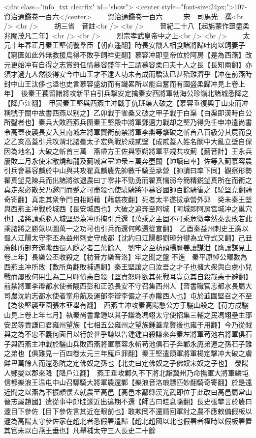 <div class="info_txt clearfix" id="show">
<center style="font-size:24px;">107-資治通鑑卷一百六</center>
  　　資治通鑑卷一百六　　　宋　司馬光　撰<br />
<br />
　　胡三省　音註<br />
<br />
　　晉紀二十八【起旃蒙作噩盡柔兆閹茂凡二年】<br />
<br />
　　烈宗孝武皇帝中之上<br />
<br />
　　太元十年春正月秦王堅朝饗羣臣【朝直遥翻】時長安饑人相食諸將歸吐肉以飼妻子【窮匱如此外無救援烏得不敗乎飼祥吏翻】慕容冲即皇帝位於阿房【是為西燕】改元更始冲有自得之志賞罸任情慕容盛年十三謂慕容柔曰夫十人之長【長知兩翻】亦須才過九人然後得安今中山王才不逮人功未有成而驕汰已甚殆難濟乎【冲在前燕時封中山王汰侈也溢也史言慕容盛幼而有識畧所以能自奮而有國盛柔歸冲見上卷上年】　後秦王萇留諸將攻新平自引兵撃安定擒秦安西將軍勃海公珍嶺北諸城悉降之【降戶江翻】　甲寅秦王堅與西燕主冲戰于仇班渠大破之【慕容垂復興于山東而冲稱號于關中故書西燕以别之】乙卯戰于雀桑又破之甲子戰于白渠【白渠即漢時白公所鑿者也】秦兵大敗西燕兵圍秦王堅殿中將軍鄧邁力戰却之堅乃得免壬申冲遣尚書令高蓋夜襲長安入其南城左將軍竇衝前禁將軍李辯等擊破之斬首八百級分其屍而食之乙亥高蓋引兵攻渭北諸壘太子宏與戰於成貳壁【成貳蓋人姓名關中大亂立壁自保因為地名】大破之斬首三萬　燕帶方王佐與寧朔將軍平規共攻薊【薊音計】王永兵屢敗二月永使宋敞燒和龍及薊城宫室帥衆三萬奔壺關【帥讀曰率】佐等入薊慕容農引兵會慕容麟於中山與共攻翟真麟農先帥數千騎至承營【帥讀曰率下同】觀察形勢翟真望見陳兵而出諸將欲退農曰丁零非不勁勇而翟真懦弱今簡精鋭望真所在而衝之真走衆必散矣乃邀門而蹙之可盡殺也使驍騎將軍慕容國帥百餘騎衝之【驍堅堯翻騎奇寄翻】真走其衆争門自相蹈藉【藉慈夜翻】死者太半遂拔承營外郭　癸未秦王堅與西燕主冲戰於城西【長安城西也】大破之追奔至阿城【阿城即阿房宫城冲之巢穴也】諸將請乘勝入城堅恐為冲所掩引兵還【萬乘之主固不可乘危徼幸然秦喪敗若此乘諸將之勝氣以圖萬一之功可也引兵而還何歟還從宣翻】　乙酉秦益州刺史王廣以蜀人江陽太守李丕為益州刺史守成都【沈約曰江陽郡劉璋分犍為立守式又翻】己丑廣帥所部奔還隴西蜀人隨之者三萬餘人　劉牢之至枋頭楊膺姜讓謀泄【膺讓謀見上卷上年】長樂公丕收殺之【枋音方樂音洛】牢之聞之盤不進　秦平原悼公暉數為西燕主冲所敗【數所角翻敗補遇翻】秦王堅讓之曰汝吾之才子也擁大衆與白虜小兒戰而屢敗何用生為三月暉憤恚自殺【堅責怒暉欲其死戰耳豈意其自殺哉恚于避翻】前禁將軍李辯都水使者隴西彭和正恐長安不守召集西州人【晉書職官志都水長屬大司農沈約志都水使者掌舟航及運部李辯李儼之子亦隴西人也】屯於韮園堅召之不至【為後堅襲韮園張本韮舉有翻】　西燕主冲攻秦高陽愍公方于驪山殺之【苻方戍驪山見上卷上年七月】執秦尚書韋鍾以其子謙為馮翊太守使招集三輔之民馮翊壘主邵安民等責謙曰君雍州望族【七相五公雍州之望族鍾蓋韋賢後也雍于用翻】今乃從賊與之為不忠不義何面目以行於世乎謙以告鍾鍾自殺謙來奔秦左將軍苟池右將軍俱石子與西燕主冲戰於驪山兵敗西燕將軍慕容永斬苟池俱石子奔鄴永廆弟運之孫石子難之弟也【俱難見一百四卷太元三年廆戶罪翻】秦王堅遣領軍將軍楊定擊冲大破之虜鮮卑萬餘人而還悉阬之定佛奴之孫也【北史曰定佛奴之子佛奴宋奴之子也】　滎陽人鄭燮以郡來降【降戶江翻】　燕王垂攻鄴久不下將北詣冀州乃命撫軍大將軍麟屯信都樂浪王温屯中山召驃騎大將軍農還鄴【樂浪音洛琅驃匹妙翻騎奇寄翻】於是遠近聞之以燕為不振頗懷去就農至高邑【高邑本鄗縣漢光武即位于此改曰高邑屬常山晉志屬趙國】遣從事中郎眭邃近出違期不還【師古曰眭息隨翻】長史張攀言於農曰邃目下參佐【目下參佐言其近在眼前也】敢欺罔不還請回軍討之農不應敕備假板以邃為高陽太守參佐家在趙北者悉假署遣歸【趙北趙國以北也假署者權時以假板署置其官未以白燕王垂也】凡舉補太守三人長史二十餘
